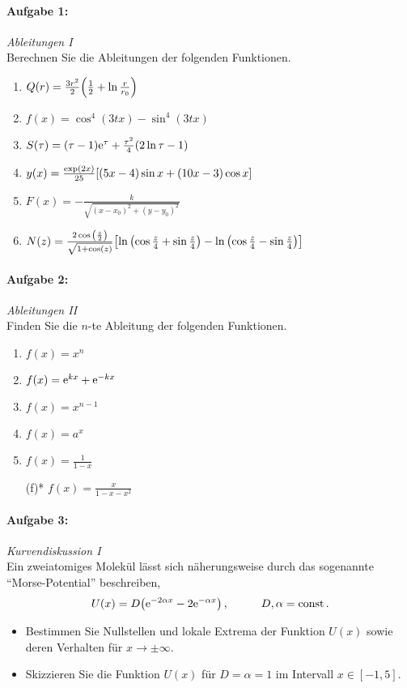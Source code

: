 
\paragraph{Aufgabe 1: } \emph{Ableitungen I}\\[0.2cm]
Berechnen Sie die Ableitungen der folgenden Funktionen.
\begin{enumerate}[label=(\alph*)]
    \item $Q(r)=\frac{3r^2}{2}\qty(\frac{1}{2}+\ln\frac{r}{r_0})$
    \item $f(x)=\cos^4(3tx)-\sin^4(3tx)$
    \item $S(\tau)=(\tau-1)\mathrm{e}^{\tau}+\frac{\tau^2}{4}\qty(2\ln\tau-1)$
    \item $y(x)=\frac{\exp(2x)}{25}\qty[(5x-4)\sin x+(10x-3)\cos x]$
    \item $F(x)=-\frac{k}{\sqrt{(x-x_0)^2+(y-y_0)^2}}$
    \item $N(z)=\frac{2\cos\qty(\frac{z}{2})}{\sqrt{1+\cos(z)}}\qty[\ln\qty(\cos\frac{z}{4}+\sin\frac{z}{4})-\ln\qty(\cos\frac{z}{4}-\sin\frac{z}{4})]$
\end{enumerate}
%
\paragraph{Aufgabe 2: } \emph{Ableitungen II}\\[0.2cm]
Finden Sie die $n$-te Ableitung der folgenden Funktionen.
\begin{multicols}{2}
    \begin{enumerate}[label=(\alph*)]
        \item $f(x)=x^n$
        \item $f(x)=\mathrm{e}^{kx}+\mathrm{e}^{-kx}$
        \item $f(x)=x^{n-1}$
        \item $f(x)=a^x$ 
        \item $f(x)=\frac{1}{1-x}$
        \item[(f)*] $f(x)=\frac{x}{1-x-x^2}$ 
    \end{enumerate}
\end{multicols}
%
\paragraph{Aufgabe 3: } \emph{Kurvendiskussion I}\\[0.2cm]
Ein zweiatomiges Molekül lässt sich näherungsweise durch das sogenannte ``Morse-Potential'' beschreiben,
\begin{align*}
U(x)=D\qty(\mathrm{e}^{-2\alpha x}-2\mathrm{e}^{-\alpha x})\,, \hspace{1cm} D,\alpha=\operatorname{const}.
\end{align*}
\begin{itemize}
\item Bestimmen Sie Nullstellen und lokale Extrema der Funktion $U(x)$ sowie deren Verhalten für $x \to\pm\infty$.
\item Skizzieren Sie die Funktion $U(x)$ für $D=\alpha=1$ im Intervall $x\in[-1,5]$.
\end{itemize}
%
